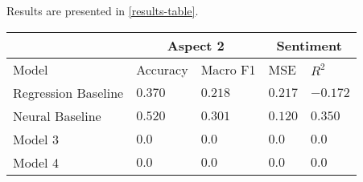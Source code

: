 Results are presented in \ref{results-table}.

\begin{table*}
    \small
    \caption{Test Error Rates and F1 Scores for Classification, test MSE and R2 for Regression}
    \label{results-table}
    \centering
    \begin{tabular}{lllll}
        \multicolumn{1}{c}{} & \multicolumn{2}{c}{Aspect 2} & \multicolumn{2}{c}{Sentiment}\\
        \hline
        Model                   & Accuracy         & Macro F1         & MSE              & $R^2$ \\
        \midrule
        Regression Baseline     & $0.370$          & $0.218$          & $0.217$          & $-0.172$          \\
        Neural Baseline         & $\mathbf{0.520}$ & $\mathbf{0.301}$ & $\mathbf{0.120}$ & $\mathbf{0.350}$  \\
        Model 3                 & $0.0$            & $0.0$            & $0.0$            & $0.0$             \\
        Model 4                 & $0.0$            & $0.0$            & $0.0$            & $0.0$             \\
        \bottomrule
    \end{tabular}
\end{table*}

